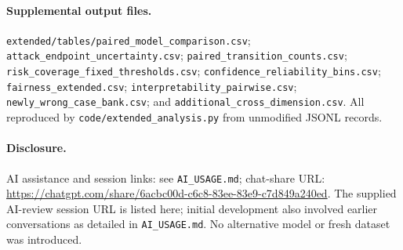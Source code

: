 \documentclass[10pt,a4paper,twocolumn]{article}
\begin{document}
\paragraph{Supplemental output files.} \texttt{extended/tables/paired\_model\_comparison.csv}; \texttt{attack\_endpoint\_uncertainty.csv}; \texttt{paired\_transition\_counts.csv}; \texttt{risk\_coverage\_fixed\_thresholds.csv}; \texttt{confidence\_reliability\_bins.csv}; \texttt{fairness\_extended.csv}; \texttt{interpretability\_pairwise.csv}; \texttt{newly\_wrong\_case\_bank.csv}; and \texttt{additional\_cross\_dimension.csv}. All reproduced by \texttt{code/extended\_analysis.py} from unmodified JSONL records.
\paragraph{Disclosure.} AI assistance and session links: see \texttt{AI\_USAGE.md}; chat-share URL: \url{https://chatgpt.com/share/6acbc00d-c6c8-83ee-83e9-c7d849a240ed}. The supplied AI-review session URL is listed here; initial development also involved earlier conversations as detailed in \texttt{AI\_USAGE.md}. No alternative model or fresh dataset was introduced.
\end{document}

